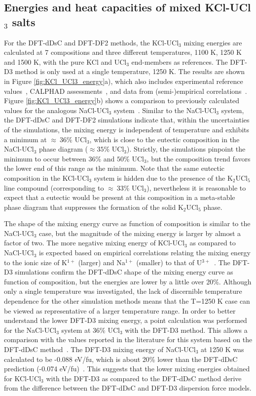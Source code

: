 \documentclass[preprint,3p,10pt,twocolumn,number,sort&compress]{elsarticle}
\begin{document}
\subsection{Energies and heat capacities of mixed KCl-UCl$_3$ salts}
For the DFT-dDsC and DFT-DF2 methods, the KCl-UCl$_3$ mixing energies are calculated at 7 compositions and three different temperatures, 1100 K, 1250 K and 1500 K, with the pure KCl and UCl$_3$ end-members as references. The DFT-D3 method is only used at a single temperature, 1250 K. The results are shown in Figure \ref{fig:KCl_UCl3_energy}a), which also includes experimental reference values~\cite{Rycerz}, CALPHAD assessments~\cite{YIN2020,Ghosh}, and data from (semi-)empirical correlations~\cite{Pinto}. 
Figure \ref{fig:KCl_UCl3_energy}b) shows a comparison to previously calculated values for the analogous NaCl-UCl$_3$ system~\cite{Andersson}. 
Similar to the NaCl-UCl$_3$ system, the DFT-dDsC and DFT-DF2 simulations indicate that, within the uncertainties of the simulations, the mixing energy is independent of temperature and exhibits a minimum at $\approx~36$\% UCl$_3$, which is close to the eutectic composition in the NaCl-UCl$_3$ phase diagram ($\approx 35$\% UCl$_3$). 
Strictly, the simulations pinpoint the minimum to occur between $36$\% and $50$\% UCl$_3$, but the composition trend favors the lower end of this range as the minimum. Note that the same eutectic composition in the KCl-UCl$_3$ system is hidden due to the presence of the K$_2$UCl$_5$ line compound (corresponding to $\approx~33$\% UCl$_3$), nevertheless it is reasonable to expect that a eutectic would be present at this composition in a meta-stable phase diagram that suppresses the formation of the solid K$_2$UCl$_5$ phase. 

The shape of the mixing energy curve as function of composition is similar to the NaCl-UCl$_3$ case, but the magnitude of the mixing energy is larger by almost a factor of two.  
The more negative mixing energy of KCl-UCl$_3$ as compared to NaCl-UCl$_3$ is expected based on empirical correlations relating the mixing energy to the ionic size of K$^{1+}$ (larger) and Na$^{1+}$ (smaller) to that of U$^{3+}$~\cite{YIN2020,Pinto}. The DFT-D3 simulations confirm the DFT-dDsC shape of the mixing energy curve as function of composition, but the energies are lower by a little over 20\%. 
Although only a single temperature was investigated, the lack of discernible temperature dependence for the other simulation methods means that the T=1250 K case can be viewed as representative of a larger temperature range.
In order to better understand the lower DFT-D3 mixing energy, a point calculation was performed for the NaCl-UCl$_3$ system at 36\% UCl$_3$ with the DFT-D3 method. This allows a comparison with the values reported in the literature for this system based on the DFT-dDsC method~\cite{Andersson}. 
The DFT-D3 mixing energy of NaCl-UCl$_3$ at 1250 K was calculated to be -0.088 eV/fu, which is about 20\% lower than the DFT-dDsC prediction (-0.074 eV/fu)~\cite{Andersson}. This suggests that the lower mixing energies obtained for KCl-UCl$_3$ with the DFT-D3 as compared to the DFT-dDsC method derive from the difference between the DFT-dDsC and DFT-D3 dispersion force models. 
\end{document}
